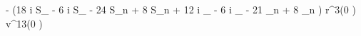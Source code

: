 -  \left(18 i S_{\lambda} \nu - 6 i S_{\lambda} - 24 S_{n} \nu + 8 S_{n} + 12 i \Sigma_{\lambda} \delta \nu - 6 i \Sigma_{\lambda} \delta - 21 \Sigma_{n} \delta \nu + 8 \Sigma_{n} \delta\right) r^{3}{\left (0 \right )} v^{13}{\left (0 \right )}